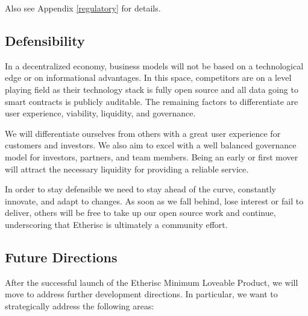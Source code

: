 \documentclass[12pt]{article}
\begin{document}
Also see Appendix \ref{regulatory} for details.

\subsection{Defensibility}

In a decentralized economy, business models will not be based on a technological edge or on informational advantages. In this space, competitors are on a level playing field as their technology stack is fully open source and all data going to smart contracts is publicly auditable. The remaining factors to differentiate are user experience, viability, liquidity, and governance.

We will differentiate ourselves from others with a great user experience for customers and investors. We also aim to excel with a well balanced governance model for investors, partners, and team members. Being an early or first mover will attract the necessary liquidity for providing a reliable service.

In order to stay defensible we need to stay ahead of the curve, constantly innovate, and adapt to changes. As soon as we fall behind, lose interest or fail to deliver, others will be free to take up our open source work and continue, underscoring that Etherisc is ultimately a community effort.

\subsection{Future Directions}

After the successful launch of the Etherisc Minimum Loveable Product, we will move to address further development directions. In particular, we want to strategically address the following areas:
\end{document}
